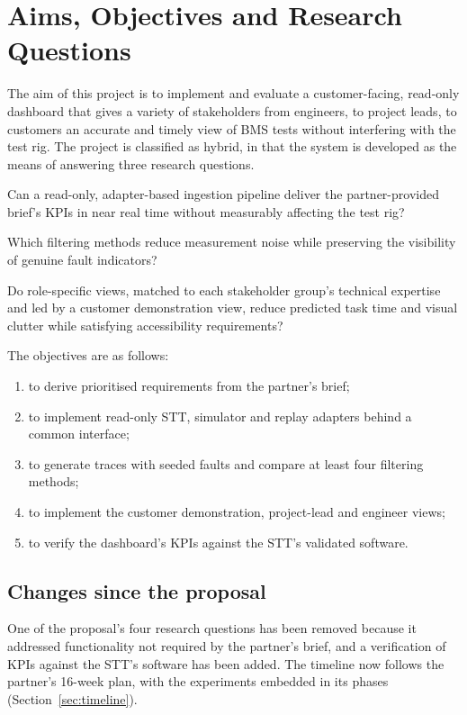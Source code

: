 \section{Aims, Objectives and Research Questions}
\label{sec:aims}

The aim of this project is to implement and evaluate a customer-facing, read-only dashboard that gives a variety of stakeholders from engineers, to project leads, to customers an accurate and timely view of BMS tests without interfering with the test rig.
The project is classified as hybrid, in that the system is developed as the means of answering three research questions.

\begin{description}[leftmargin=1.2em, labelindent=0pt, font=\normalfont\bfseries]
    \item[RQ1.] Can a read-only, adapter-based ingestion pipeline deliver the partner-provided brief's KPIs in near real time without measurably affecting the test rig?
    \item[RQ2.] Which filtering methods reduce measurement noise while preserving the visibility of genuine fault indicators?
    \item[RQ3.] Do role-specific views, matched to each stakeholder group's technical expertise and led by a customer demonstration view, reduce predicted task time and visual clutter while satisfying accessibility requirements?
\end{description}

The objectives are as follows:
\begin{enumerate}[label=\textbf{O\arabic*}]
    \item to derive prioritised requirements from the partner's brief;
    \item to implement read-only STT, simulator and replay adapters behind a common interface;
    \item to generate traces with seeded faults and compare at least four filtering methods;
    \item to implement the customer demonstration, project-lead and engineer views;
    \item to verify the dashboard's KPIs against the STT's validated software.
\end{enumerate}

\subsection{Changes since the proposal}\label{subsec:changes-since-the-proposal}
One of the proposal's four research questions has been removed because it addressed functionality not required by the partner's brief, and a verification of KPIs against the STT's software has been added.
The timeline now follows the partner's 16-week plan, with the experiments embedded in its phases (Section~\ref{sec:timeline}).
